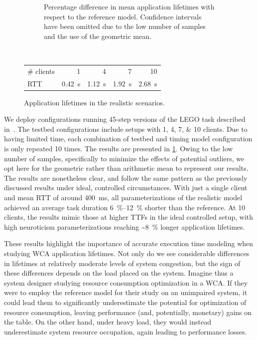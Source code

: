 \begin{figure}
\begin{subfigure}[t]{.45\textwidth}
        \caption{%
            Percentage difference in mean application lifetimes with respect to the reference model.
            Confidence intervals have been omitted due to the low number of samples and the use of the geometric mean.
        }
    \end{subfigure}\\
    \bigskip
    \begin{subtable}{\textwidth}
        \centering
        \begin{tabular}{lrrrr}
            \toprule
            \# clients & 1 & 4 & 7 & 10 \\
            \gls{RTT} & \SI{0.42}{\second} & \SI{1.12}{\second} & \SI{1.92}{\second} & \SI{2.68}{\second} \\
            \bottomrule
        \end{tabular}
        \caption{Mean measured \glspl{RTT} for each testbed configuration.}
    \end{subtable}
    \caption{Application lifetimes in the realistic scenarios.}\label{fig:testbed_lifetimes}
\end{figure}

We deploy configurations running \num{45}-step versions of the LEGO task described in~\cite{olguinmunoz2021impact}.
The testbed configurations include setups with \numlist{1;4;7;10} clients.
Due to having limited time, each combination of testbed and timing model configuration is only repeated \num{10} times.
The results are presented in \cref{fig:testbed_lifetimes}.
Owing to the low number of samples, specifically to minimize the effects of potential outliers, we opt here for the geometric rather than arithmetic mean to represent our results.
The results are nonetheless clear, and follow the same pattern as the previously discussed results under ideal, controlled circumstances.
With just a single client and mean \gls{RTT} of around \SI{400}{\milli\second}, all parameterizations of the realistic model achieved an average task duration \SIrange{6}{12}{\percent} shorter than the reference.
At \num{10} clients, the results mimic those at higher \glspl{TTF} in the ideal controlled setup, with high neuroticism parameterizations reaching \textasciitilde\SI{8}{\percent} longer application lifetimes.

These results highlight the importance of accurate execution time modeling when studying \gls{WCA} application lifetimes.
Not only do we see considerable differences in lifetimes at relatively moderate levels of system congestion, but the sign of these differences depends on the load placed on the system.
Imagine thus a system designer studying resource consumption optimization in a \gls{WCA}.
If they were to employ the reference model for their study on an unimpaired system, it could lead them to significantly underestimate the potential for optimization of resource consumption, leaving performance (and, potentially, monetary) gains on the table.
On the other hand, under heavy load, they would instead underestimate system resource occupation, again leading to performance losses.

